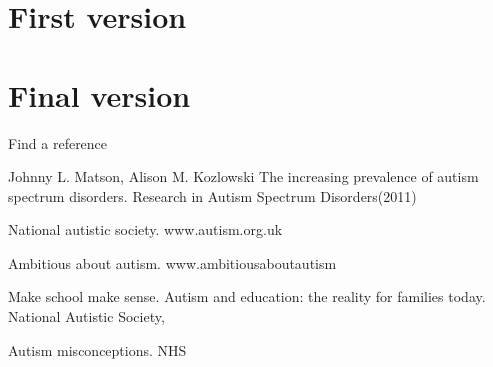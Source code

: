 \documentclass[11pt]{report}
\begin{document}
\chapter{First version}

\chapter{Final version}

\begin{thebibliography}{9}

Find a reference

Johnny L. Matson, Alison M. Kozlowski
The increasing prevalence of autism spectrum disorders. Research in Autism Spectrum Disorders(2011)

National autistic society. www.autism.org.uk

Ambitious about autism. www.ambitiousaboutautism

Make school make sense. Autism and education: the reality for families today. National Autistic Society, 

Autism misconceptions. NHS


\end{thebibliography}
\end{document}
